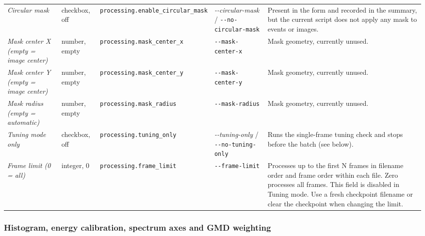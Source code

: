 \documentclass[11pt,a4paper]{article}
\newcommand{\code}[1]{\texttt{#1}}
\begin{document}
\begin{center}
\begin{longtable}{@{}L{3.4cm}L{2.3cm}L{2.5cm}L{2.8cm}L{4.9cm}@{}}
\addlinespace
\emph{Circular mask} & checkbox, off & \code{processing.\allowbreak{}enable\_\allowbreak{}circular\_\allowbreak{}mask} &
\emph{-\allowbreak{}-\allowbreak{}circular-\allowbreak{}mask} / \code{-\allowbreak{}-\allowbreak{}no-\allowbreak{}circular-\allowbreak{}mask} & Present in the form and
recorded in the summary, but the current script does not apply any mask to
events or images. \\
\addlinespace
\emph{Mask center X (empty = image center)} & number, empty &
\code{processing.mask\_\allowbreak{}center\_\allowbreak{}x} & \code{-\allowbreak{}-\allowbreak{}mask-\allowbreak{}center-\allowbreak{}x} & Mask geometry,
currently unused. \\
\addlinespace
\emph{Mask center Y (empty = image center)} & number, empty &
\code{processing.mask\_\allowbreak{}center\_\allowbreak{}y} & \code{-\allowbreak{}-\allowbreak{}mask-\allowbreak{}center-\allowbreak{}y} & Mask geometry,
currently unused. \\
\addlinespace
\emph{Mask radius (empty = automatic)} & number, empty &
\code{processing.mask\_\allowbreak{}radius} & \code{-\allowbreak{}-\allowbreak{}mask-\allowbreak{}radius} & Mask geometry,
currently unused. \\
\addlinespace
\emph{Tuning mode only} & checkbox, off & \code{processing.\allowbreak{}tuning\_\allowbreak{}only} &
\emph{-\allowbreak{}-\allowbreak{}tuning-\allowbreak{}only} / \code{-\allowbreak{}-\allowbreak{}no-\allowbreak{}tuning-\allowbreak{}only} & Runs the single-frame tuning
check and stops before the batch (see below). \\
\addlinespace
\emph{Frame limit (0 = all)} & integer, 0 & \code{processing.\allowbreak{}frame\_\allowbreak{}limit} &
\code{-\allowbreak{}-\allowbreak{}frame-\allowbreak{}limit} & Processes up to the first N frames in filename
order and frame order within each file. Zero processes all frames. This field
is disabled in Tuning mode. Use a fresh checkpoint filename or clear the
checkpoint when changing the limit. \\
\end{longtable}
\end{center}

\subsubsection*{Histogram, energy calibration, spectrum axes and GMD weighting}
\end{document}
